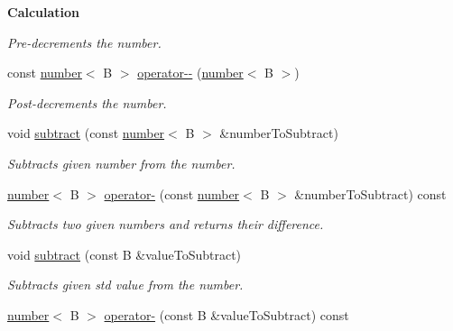 \begin{Indent}{\bf Calculation}
\begin{DoxyCompactItemize}
\begin{DoxyCompactList}\small\item\em Pre-\/decrements the number. \end{DoxyCompactList}\item 
\hypertarget{classcjr_1_1number_a2a460b5913da02ccf4331c7b9afd5fb8}{const \hyperlink{classcjr_1_1number}{number}$<$ B $>$ \hyperlink{classcjr_1_1number_a2a460b5913da02ccf4331c7b9afd5fb8}{operator-\/-\/} (\hyperlink{classcjr_1_1number}{number}$<$ B $>$)}\label{classcjr_1_1number_a2a460b5913da02ccf4331c7b9afd5fb8}

\begin{DoxyCompactList}\small\item\em Post-\/decrements the number. \end{DoxyCompactList}\item 
\hypertarget{classcjr_1_1number_aa29378479836924b1110f40570198ada}{void \hyperlink{classcjr_1_1number_aa29378479836924b1110f40570198ada}{subtract} (const \hyperlink{classcjr_1_1number}{number}$<$ B $>$ \&number\-To\-Subtract)}\label{classcjr_1_1number_aa29378479836924b1110f40570198ada}

\begin{DoxyCompactList}\small\item\em Subtracts given number from the number. \end{DoxyCompactList}\item 
\hypertarget{classcjr_1_1number_a9b54e89597d8db867a7d30bab2c8d10a}{\hyperlink{classcjr_1_1number}{number}$<$ B $>$ \hyperlink{classcjr_1_1number_a9b54e89597d8db867a7d30bab2c8d10a}{operator-\/} (const \hyperlink{classcjr_1_1number}{number}$<$ B $>$ \&number\-To\-Subtract) const }\label{classcjr_1_1number_a9b54e89597d8db867a7d30bab2c8d10a}

\begin{DoxyCompactList}\small\item\em Subtracts two given numbers and returns their difference. \end{DoxyCompactList}\item 
\hypertarget{classcjr_1_1number_af95e527ca950399a3af5dbf12d01afc5}{void \hyperlink{classcjr_1_1number_af95e527ca950399a3af5dbf12d01afc5}{subtract} (const B \&value\-To\-Subtract)}\label{classcjr_1_1number_af95e527ca950399a3af5dbf12d01afc5}

\begin{DoxyCompactList}\small\item\em Subtracts given std value from the number. \end{DoxyCompactList}\item 
\hypertarget{classcjr_1_1number_ad48de2316e1e5c962c84eb4f4ad5cfc8}{\hyperlink{classcjr_1_1number}{number}$<$ B $>$ \hyperlink{classcjr_1_1number_ad48de2316e1e5c962c84eb4f4ad5cfc8}{operator-\/} (const B \&value\-To\-Subtract) const }\label{classcjr_1_1number_ad48de2316e1e5c962c84eb4f4ad5cfc8}


\end{DoxyCompactItemize}
\end{Indent}
